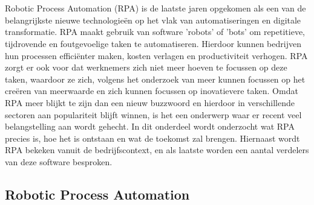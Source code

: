 \chapter{}%
\label{ch:stand-van-zaken}

Robotic Process Automation (RPA) is de laatste jaren opgekomen als een van de belangrijkste nieuwe technologieën op het vlak van automatiseringen en digitale transformatie. RPA maakt gebruik van software 'robots' of 'bots' om repetitieve, tijdrovende en foutgevoelige taken te automatiseren. Hierdoor kunnen bedrijven hun processen efficiënter maken, kosten verlagen en productiviteit verhogen. 
RPA zorgt er ook voor dat werknemers zich niet meer hoeven te focussen op deze taken, waardoor ze zich, volgens het onderzoek van \textcite{ZalewskaTurzynska2022} meer kunnen focussen op het creëren van meerwaarde en zich kunnen focussen op inovatievere taken. Omdat RPA meer blijkt te zijn dan een nieuw buzzwoord en hierdoor in verschillende sectoren aan populariteit blijft winnen, is het een onderwerp waar er recent veel belangstelling aan wordt gehecht.
In dit onderdeel wordt onderzocht wat RPA precies is, hoe het is ontstaan en wat de toekomst zal brengen. Hiernaast wordt RPA bekeken vanuit de bedrijfscontext, en als laatste worden een aantal verdelers van deze software besproken.

\section{Robotic Process Automation}

